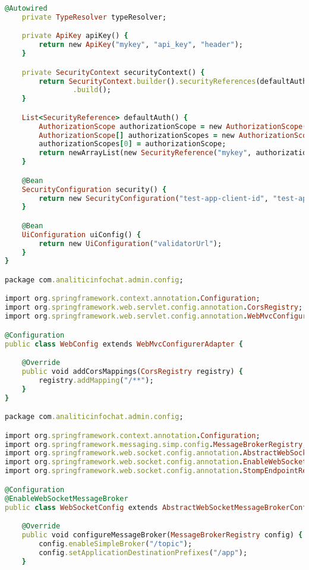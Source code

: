 \begin{lstlisting}[language=Ruby, style=rubystyle]
    @Autowired
    private TypeResolver typeResolver;

    private ApiKey apiKey() {
        return new ApiKey("mykey", "api_key", "header");
    }

    private SecurityContext securityContext() {
        return SecurityContext.builder().securityReferences(defaultAuth()).forPaths(PathSelectors.regex("/anyPath.*"))
                .build();
    }

    List<SecurityReference> defaultAuth() {
        AuthorizationScope authorizationScope = new AuthorizationScope("global", "accessEverything");
        AuthorizationScope[] authorizationScopes = new AuthorizationScope[1];
        authorizationScopes[0] = authorizationScope;
        return newArrayList(new SecurityReference("mykey", authorizationScopes));
    }

    @Bean
    SecurityConfiguration security() {
        return new SecurityConfiguration("test-app-client-id", "test-app-realm", "test-app", "apiKey");
    }

    @Bean
    UiConfiguration uiConfig() {
        return new UiConfiguration("validatorUrl");
    }
}

package com.analiticinfochat.admin.config;

import org.springframework.context.annotation.Configuration;
import org.springframework.web.servlet.config.annotation.CorsRegistry;
import org.springframework.web.servlet.config.annotation.WebMvcConfigurerAdapter;

@Configuration
public class WebConfig extends WebMvcConfigurerAdapter {

    @Override
    public void addCorsMappings(CorsRegistry registry) {
        registry.addMapping("/**");
    }
}

package com.analiticinfochat.admin.config;

import org.springframework.context.annotation.Configuration;
import org.springframework.messaging.simp.config.MessageBrokerRegistry;
import org.springframework.web.socket.config.annotation.AbstractWebSocketMessageBrokerConfigurer;
import org.springframework.web.socket.config.annotation.EnableWebSocketMessageBroker;
import org.springframework.web.socket.config.annotation.StompEndpointRegistry;

@Configuration
@EnableWebSocketMessageBroker
public class WebSocketConfig extends AbstractWebSocketMessageBrokerConfigurer {

    @Override
    public void configureMessageBroker(MessageBrokerRegistry config) {
        config.enableSimpleBroker("/topic");
        config.setApplicationDestinationPrefixes("/app");
    }


\end{lstlisting}

